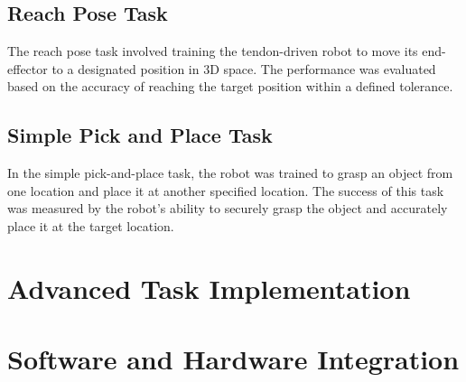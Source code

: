 \subsection{Reach Pose Task}
The reach pose task involved training the tendon-driven robot to move its end-effector to a designated position in 3D space. 
The performance was evaluated based on the accuracy of reaching the target position within a defined tolerance.

\subsection{Simple Pick and Place Task}
In the simple pick-and-place task, the robot was trained to grasp an object from one location and place it at another specified location. 
The success of this task was measured by the robot's ability to securely grasp the object and accurately place it at the target location.

\subsection{}

\section{Advanced Task Implementation} %

\section{Software and Hardware Integration} %
